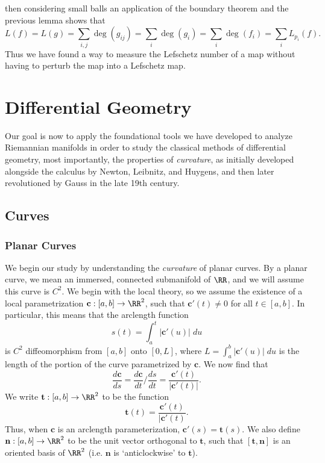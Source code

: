 then considering small balls an application of the boundary theorem and the previous lemma shows that
%
\[ L(f) = L(g) = \sum_{i,j} \deg(g_{ij}) = \sum_i \deg(g_i) = \sum_i \deg(f_i) = \sum_i L_{p_i}(f). \]
%
Thus we have found a way to measure the Lefschetz number of a map without having to perturb the map into a Lefschetz map.










\part{Differential Geometry}

Our goal is now to apply the foundational tools we have developed to analyze Riemannian manifolds in order to study the classical methods of differential geometry, most importantly, the properties of \emph{curvature}, as initially developed alongside the calculus by Newton, Leibnitz, and Huygens, and then later revolutioned by Gauss in the late 19th century.

\chapter{Curves}






\section{Planar Curves}

We begin our study by understanding the \emph{curvature} of planar curves. By a planar curve, we mean an immersed, connected submanifold of $\RR$, and we will assume this curve is $C^2$. We begin with the local theory, so we assume the existence of a local parametrization $\mathbf{c}: [a,b] \to \RR^2$, such that $\mathbf{c}'(t) \neq 0$ for all $t \in [a,b]$. In particular, this means that the arclength function
%
\[ s(t) = \int_a^t |\mathbf{c}'(u)|\; du \]
%
is $C^2$ diffeomorphism from $[a,b]$ onto $[0,L]$, where $L = \int_a^b |\mathbf{c}'(u)|\; du$ is the length of the portion of the curve parametrized by $\mathbf{c}$. We now find that
%
\[ \frac{d\mathbf{c}}{ds} = \frac{d\mathbf{c}}{dt} \bigg/ \frac{ds}{dt} = \frac{\mathbf{c}'(t)}{|\mathbf{c}'(t)|}. \]
%
We write $\mathbf{t}: [a,b] \to \RR^2$ to be the function
%
\[ \mathbf{t}(t) = \frac{\mathbf{c}'(t)}{|\mathbf{c}'(t)}. \]
%
Thus, when $\mathbf{c}$ is an arclength parameterization, $\mathbf{c}'(s) = \mathbf{t}(s)$. We also define $\mathbf{n}: [a,b] \to \RR^2$ to be the unit vector orthogonal to $\mathbf{t}$, such that $[\mathbf{t}, \mathbf{n}]$ is an oriented basis of $\RR^2$ (i.e. $\mathbf{n}$ is `anticlockwise' to $\mathbf{t}$).

